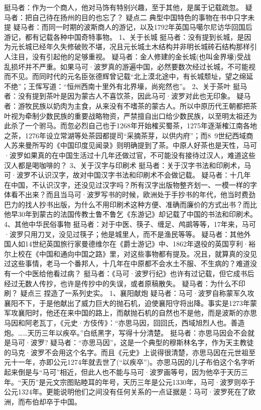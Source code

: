 \documentclass[12pt,UTF8]{ctexbook}
\begin{document}
挺马者：作为一个商人，他对马饰有特别兴趣，至于其他，是属于记载疏忽。
疑马者：把自己待在扬州的目的也忘了？
疑点二
典型中国特色的事物在书中只字未提
疑马者：而同一时期的波斯商人的游记，以及1792年英国马噶尔尼访华回国后游记，都有记载各种中国奇特事物。
1、关于长城
挺马者：没有提到长城，是因为元长城已经年久失修破败不堪，况且元长城土木结构并非明长城砖石结构那样引人注目，没有引起他的足够重视。
疑马者：金人修建的金长城(也叫金界壕)受战乱损坏并不严重。如果马可·波罗真的游遍中国，必然要数次经过长城，不可能视而不见。而同时代的元名臣张德辉曾记载“北上漠北途中，有长城颓址，望之绵延不绝”；王恽写道：“恒州西南十里外有北界壕，尚宛然也”。
2、关于茶叶
挺马者：没有提到茶叶是因为蒙古人不喜饮茶，因此马可·波罗对此也无印象。
疑马者：游牧民族以奶肉为主食，从来没有不嗜茶的蒙古人。所以中原历代王朝都把茶叶视为牵制少数民族的重要战略物资，严禁擅自出口给少数民族，以至明太祖还为此杀了一个驸马。而忽必烈自己也于1268年开始榷买蜀茶，1275年逐渐榷江南各地之茶，1276年设立常湖等处茶园都提司“采摘茶芽，以供内府”；而8~9世纪西域商人苏来曼所写的《中国印度见闻录》则明确提到了茶。中原人好茶也是天性，马可·波罗如果真的在中国生活过十几年还做过官，不可能没有接待过汉人，难道这些汉人都是喝咖啡的？
3、关于汉字与印刷术
挺马者：关于汉字书法和印刷术，马可·波罗不认识汉字，故对中国汉字书法和印刷术不会做记载。
疑马者：十几年在中国，不认识汉字，还没见过汉字吗？所有汉字出版物整齐划一、一模一样的字体看不出来？而且当马可·波罗写书的时候，欧洲处于手抄书的年代，他当时费劲巴力的找人抄书出版，为什么不用印刷术这种方便、准确而廉价的方式出书？而比他早30年到蒙古的法国传教士鲁不鲁乞《东游记》却记载了中国的书法和印刷术。
4、其他中华民俗事物
挺马者：对于中医、筷子、缠足、鸬鹚等等，17年来，马可·波罗只用刀叉，没见过筷子；他是城里人，而不是渔民等等。
疑马者：其他外国人如14世纪英国旅行家曼德维尔在《爵士游记》中、1862年退役的英国亨利·裕尔上校在《中国和通向中国之路》里，对这些事物都有提及。况且，就算真的没见过这些事情，老马一个番邦人，十几年在中原都不会水土不服、不生病的？难道没有一个中医给他看过病？
挺马者：《马可·波罗行纪》也许有过记载，但它成书后经过无数人传抄，也许是传抄中的失误，或者原稿散失。
疑马者：为什么不印刷？
疑点三
捏造了一系列史实。
1、襄阳献炮
疑马者：马可·波罗自称蒙军久攻襄阳不下，于是他献出了威力巨大的抛石机，迫使襄阳守将出降。事实是1273年蒙军攻襄阳时，他还在来中国的路上，而献抛石机的自然也不是他，而是波斯的亦思马因和阿老瓦丁，《元史·方伎传》：“亦思马因，回回氏，西域旭烈人也。善造炮。……天历三年以疾卒。”白纸黑字，写得十分清楚。
挺马者：亦思马因会不会就是马可·波罗?
疑马者：“亦思马因”，这是一个典型的穆斯林名字，作为天主教徒的马克·波罗不会用这个名字。而且《元史》上说得很清楚，亦思马因在元世祖至元十一年，亦即公元1274年就去世了(“以疾卒”)。亦思马因的儿子布伯这个名字听起来倒是与“马可”相近，但此人也不能与马可·波罗画等号，因为他卒于天历三年。“天历”是元文宗图贴睦耳的年号，天历三年是公元1330年，马可·波罗则卒于公元1324年。更能说明他们之间没有任何关系的一点证据是：马可·波罗死在了欧洲，而布伯却卒于中国。
\end{document}
